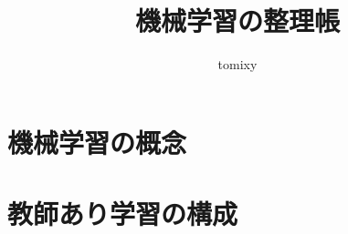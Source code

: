 \documentclass[b5paper,12pt,notitlepage]{jsreport}
\title{機械学習の整理帳}
\author{tomixy}
\begin{document}
\maketitle
\tableofcontents

\part{機械学習の概念}



\part{教師あり学習の構成}



\newpage
\end{document}

